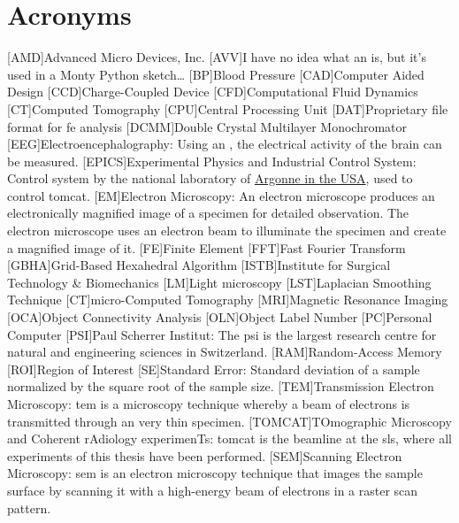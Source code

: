     \chapter*{Acronyms}
	\begin{acronym}[WF-SRXTM]
		[AMD]{Advanced Micro Devices, Inc.}
		[AVV]{I have no idea what an  is, but it's used in a Monty Python sketch\ldots}
		[BP]{Blood Pressure}
		[CAD]{Computer Aided Design}
		[CCD]{Charge-Coupled Device}
		[CFD]{Computational Fluid Dynamics}
		[CT]{Computed Tomography}
		[CPU]{Central Processing Unit}
		[DAT]{Proprietary file format for \acs{fe} analysis}
		{Double Crystal Multilayer Monochromator}
		[EEG]{Electroencephalography}: Using an , the electrical activity of the brain can be measured.
		[EPICS]{Experimental Physics and Industrial Control System}: Control system by the national laboratory of \href{http://www.aps.anl.gov/epics/}{Argonne in the USA}, used to control \acs{tomcat}.
		[EM]{Electron Microscopy}: An electron microscope produces an electronically magnified image of a specimen for detailed observation. The electron microscope uses an electron beam to illuminate the specimen and create a magnified image of it.
		[FE]{Finite Element}
		[FFT]{Fast Fourier Transform}
		{Grid-Based Hexahedral Algorithm}
		{Institute for Surgical Technology \& Biomechanics}
		[LM]{Light microscopy}
		[LST]{Laplacian Smoothing Technique}
		[\micro CT]{micro-Computed Tomography}
		[MRI]{Magnetic Resonance Imaging}
		[OCA]{Object Connectivity Analysis}
		[OLN]{Object Label Number}
		[PC]{Personal Computer}
		[PSI]{Paul Scherrer Institut}: The \acs{psi} is the largest research centre for natural and engineering sciences in Switzerland.
		[RAM]{Random-Access Memory}
		[ROI]{Region of Interest}
		[SE]{Standard Error}: Standard deviation of a sample normalized by the square root of the sample size.
		[TEM]{Transmission Electron Microscopy}: \acs{tem} is a microscopy  technique whereby a beam of electrons is transmitted through an very thin specimen.
		[TOMCAT]{TOmographic Microscopy and Coherent rAdiology experimenTs}: \acs{tomcat} is the beamline at the \acs{sls}, where all experiments of this thesis have been performed.
		[SEM]{Scanning Electron Microscopy}: \acs{sem} is an electron microscopy technique that images the sample surface by scanning it with a high-energy beam of electrons in a raster scan pattern.

\end{acronym}
